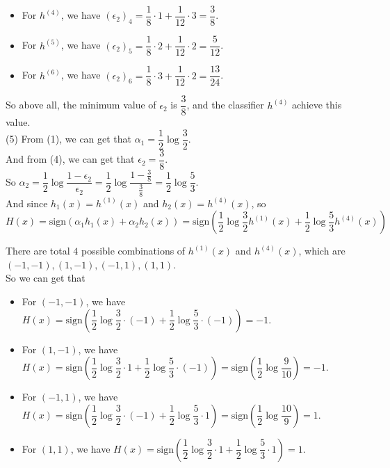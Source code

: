\documentclass[10pt]{article}
\begin{document}
\begin{enumerate}[1.]
\begin{itemize}
    \item For $h^{(4)}$, we have $(\epsilon_2)_4=\dfrac{1}{8}\cdot 1+\dfrac{1}{12}\cdot 3=\dfrac{3}{8}$.

    \item For $h^{(5)}$, we have $(\epsilon_2)_5=\dfrac{1}{8}\cdot 2+\dfrac{1}{12}\cdot 2=\dfrac{5}{12}$.

    \item For $h^{(6)}$, we have $(\epsilon_2)_6=\dfrac{1}{8}\cdot 3+\dfrac{1}{12}\cdot 2=\dfrac{13}{24}$.
\end{itemize}

So above all, the minimum value of $\epsilon_2$ is $\dfrac{3}{8}$, and the classifier $h^{(4)}$ achieve this value.\\

(5) From (1), we can get that $\alpha_1=\dfrac{1}{2}\log\dfrac{3}{2}$.\\
And from (4), we can get that $\epsilon_2=\dfrac{3}{8}$.\\
So $\alpha_2=\dfrac{1}{2}\log\dfrac{1-\epsilon_2}{\epsilon_2}=\dfrac{1}{2}\log\dfrac{1-\frac{3}{8}}{\frac{3}{8}}=\dfrac{1}{2}\log\dfrac{5}{3}$.\\
And since $h_1(x)=h^{(1)}(x)$ and $h_2(x)=h^{(4)}(x)$, so
$$H(x)=\text{sign}(\alpha_1h_1(x)+\alpha_2h_2(x))=\text{sign}\left(\dfrac{1}{2}\log\dfrac{3}{2}h^{(1)}(x)+\dfrac{1}{2}\log\dfrac{5}{3}h^{(4)}(x)\right)$$
        
There are total $4$ possible combinations of $h^{(1)}(x)$ and $h^{(4)}(x)$, which are $(-1,-1), (1,-1), (-1,1), (1,1)$.\\
So we can get that
\begin{itemize}
    \item For $(-1,-1)$, we have $H(x)=\text{sign}\left(\dfrac{1}{2}\log\dfrac{3}{2}\cdot (-1)+\dfrac{1}{2}\log\dfrac{5}{3}\cdot (-1)\right)=-1$.
    \item For $(1,-1)$, we have $H(x)=\text{sign}\left(\dfrac{1}{2}\log\dfrac{3}{2}\cdot 1+\dfrac{1}{2}\log\dfrac{5}{3}\cdot (-1)\right)=\text{sign}(\dfrac{1}{2}\log\dfrac{9}{10})=-1$.
    \item For $(-1,1)$, we have $H(x)=\text{sign}\left(\dfrac{1}{2}\log\dfrac{3}{2}\cdot (-1)+\dfrac{1}{2}\log\dfrac{5}{3}\cdot 1\right)=\text{sign}(\dfrac{1}{2}\log\dfrac{10}{9})=1$.
    \item For $(1,1)$, we have $H(x)=\text{sign}\left(\dfrac{1}{2}\log\dfrac{3}{2}\cdot 1+\dfrac{1}{2}\log\dfrac{5}{3}\cdot 1\right)=1$.
\end{itemize}


\end{enumerate}
\end{document}
